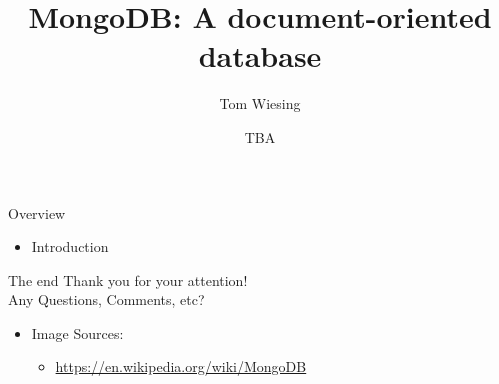 \documentclass{beamer}
\title{MongoDB: A document-oriented database}
\author{Tom Wiesing}
\institute{Databases \& Web Applications}
\date{TBA}
\begin{document}
    \frame{\titlepage}

    \begin{frame}{Overview}
      \begin{itemize}
          \item Introduction
      \end{itemize}
    \end{frame}

    

    \begin{frame}{The end}
      {\huge
        Thank you for your attention!\\
        Any Questions, Comments, etc?
      }

      \begin{itemize}
        \item Image Sources:
        \begin{itemize}
          \item \url{https://en.wikipedia.org/wiki/MongoDB}
        \end{itemize}
      \end{itemize}
    \end{frame}
\end{document}
